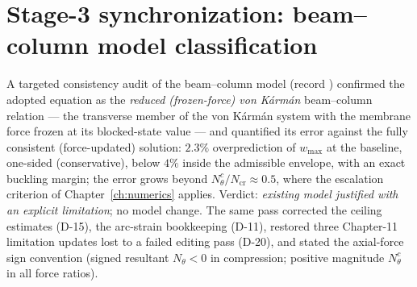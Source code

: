 \section{Stage-3 synchronization: beam--column model classification}
\label{sec:stage3}
A targeted consistency audit of the beam--column model (record
) confirmed the adopted
equation as the \emph{reduced (frozen-force) von K\'arm\'an} beam--column relation --- the
transverse member of the von K\'arm\'an system with the membrane force frozen at its
blocked-state value --- and quantified its error against the fully consistent (force-updated)
solution: $2.3\%$ overprediction of $w_{\max}$ at the baseline, one-sided (conservative),
below $4\%$ inside the admissible envelope, with an exact buckling margin; the error grows
beyond $N_\theta^c/N_{\mathrm{cr}}\approx0.5$, where the escalation criterion of
Chapter~\ref{ch:numerics} applies. Verdict: \emph{existing model justified with an explicit
limitation}; no model change. The same pass corrected the ceiling estimates (D-15), the
arc-strain bookkeeping (D-11), restored three Chapter-11 limitation updates lost to a failed
editing pass (D-20), and stated the axial-force sign convention (signed resultant
$N_\theta<0$ in compression; positive magnitude $N_\theta^c$ in all force ratios).
